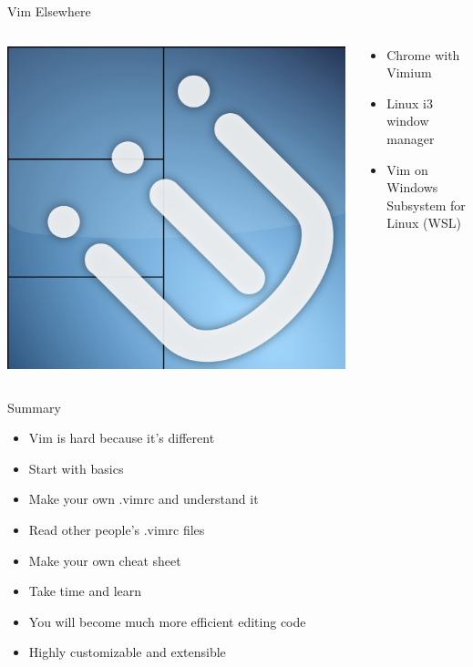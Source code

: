 \documentclass{beamer}
\begin{document}
\begin{frame}{Vim Elsewhere}
    \begin{columns}
        \begin{column}{0.4\textwidth}
            \begin{center}
                \includegraphics[width=1\textwidth]{images/i3wm-logo.png}
            \end{center}
        \end{column}
        \begin{column}{0.6\textwidth}
            \begin{itemize}
                \item Chrome with Vimium
                \item Linux i3 window manager
                \item Vim on Windows Subsystem for Linux (WSL)
            \end{itemize}
        \end{column}
    \end{columns}
\end{frame}

\begin{frame}{Summary}
    \begin{itemize}
        \item Vim is hard because it's different
        \item Start with basics
        \item Make your own .vimrc and understand it
        \item Read other people's .vimrc files
        \item Make your own cheat sheet
        \item Take time and learn
        \item You will become much more efficient editing code
        \item Highly customizable and extensible
    \end{itemize}
\end{frame}
\end{document}
